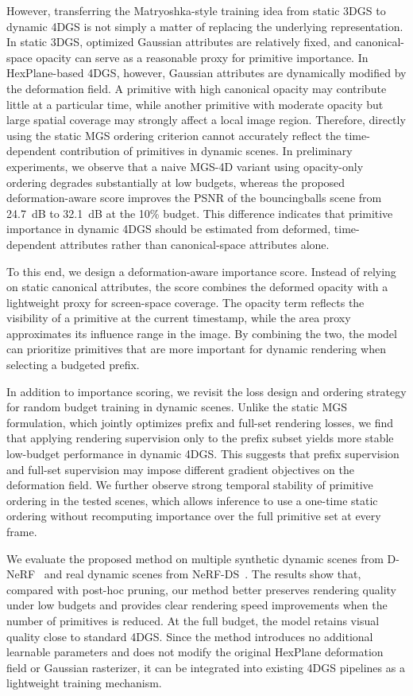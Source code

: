 \documentclass[pdflatex,sn-mathphys]{sn-jnl}
\begin{document}
However, transferring the Matryoshka-style training idea from static 3DGS to dynamic 4DGS is not simply a matter of replacing the underlying representation. In static 3DGS, optimized Gaussian attributes are relatively fixed, and canonical-space opacity can serve as a reasonable proxy for primitive importance. In HexPlane-based 4DGS, however, Gaussian attributes are dynamically modified by the deformation field. A primitive with high canonical opacity may contribute little at a particular time, while another primitive with moderate opacity but large spatial coverage may strongly affect a local image region. Therefore, directly using the static MGS ordering criterion cannot accurately reflect the time-dependent contribution of primitives in dynamic scenes. In preliminary experiments, we observe that a naive MGS-4D variant using opacity-only ordering degrades substantially at low budgets, whereas the proposed deformation-aware score improves the PSNR of the bouncingballs scene from 24.7~dB to 32.1~dB at the 10\% budget. This difference indicates that primitive importance in dynamic 4DGS should be estimated from deformed, time-dependent attributes rather than canonical-space attributes alone.

To this end, we design a deformation-aware importance score. Instead of relying on static canonical attributes, the score combines the deformed opacity with a lightweight proxy for screen-space coverage. The opacity term reflects the visibility of a primitive at the current timestamp, while the area proxy approximates its influence range in the image. By combining the two, the model can prioritize primitives that are more important for dynamic rendering when selecting a budgeted prefix.

In addition to importance scoring, we revisit the loss design and ordering strategy for random budget training in dynamic scenes. Unlike the static MGS formulation, which jointly optimizes prefix and full-set rendering losses, we find that applying rendering supervision only to the prefix subset yields more stable low-budget performance in dynamic 4DGS. This suggests that prefix supervision and full-set supervision may impose different gradient objectives on the deformation field. We further observe strong temporal stability of primitive ordering in the tested scenes, which allows inference to use a one-time static ordering without recomputing importance over the full primitive set at every frame.

We evaluate the proposed method on multiple synthetic dynamic scenes from D-NeRF~\cite{pumarola2021dnerf} and real dynamic scenes from NeRF-DS~\cite{cai2022nerfds}. The results show that, compared with post-hoc pruning, our method better preserves rendering quality under low budgets and provides clear rendering speed improvements when the number of primitives is reduced. At the full budget, the model retains visual quality close to standard 4DGS. Since the method introduces no additional learnable parameters and does not modify the original HexPlane deformation field or Gaussian rasterizer, it can be integrated into existing 4DGS pipelines as a lightweight training mechanism.
\end{document}
